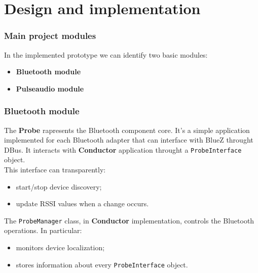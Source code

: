 \documentclass{beamer}
\begin{document}
\section{Design and implementation}

	\begin{frame}
	\frametitle{Main project modules}
		In the implemented prototype we can identify two basic modules:
		\begin{itemize}
		\item \textbf{Bluetooth module}
		\item \textbf{Pulseaudio module}
		\end{itemize}
	\end{frame}

	\begin{frame}
		\frametitle{Bluetooth module}
		The \textbf{Probe} rapresents the Bluetooth component core. It's a simple application implemented for each Bluetooth adapter that can interface with BlueZ throught DBus. It interacts with \textbf{Conductor} application throught a \texttt{ProbeInterface} object.\\ This interface can transparently:
		\begin{itemize}
		\item start/stop device discovery;
		\item update RSSI values when a change occurs.
		\end{itemize}
		\vspace{0.5cm}
		The \texttt{ProbeManager} class, in \textbf{Conductor} implementation, controls the Bluetooth operations. In particular:
		\begin{itemize}
		\item monitors device localization;
		\item stores information about every \texttt{ProbeInterface} object.
		\end{itemize}

	\end{frame}
\end{document}
